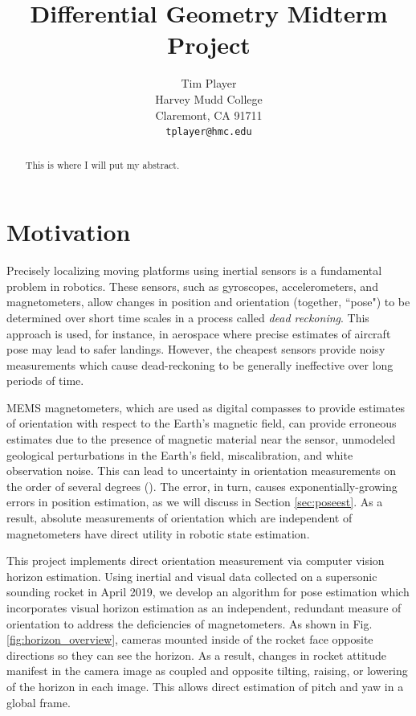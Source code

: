 \documentclass{article}
\title{Differential Geometry Midterm Project}
\author{%
 Tim Player \\
  Harvey Mudd College\\
  Claremont, CA 91711 \\
  \texttt{tplayer@hmc.edu} \\
}
\begin{document}
\maketitle

\begin{abstract}
    This is where I will put my abstract.
\end{abstract}

\section{Motivation}
Precisely localizing moving platforms using inertial sensors is a fundamental problem in robotics. These sensors, such as gyroscopes, accelerometers, and magnetometers, allow changes in position and orientation (together, ``pose") to be determined over short time scales in a process called \textit{dead reckoning}. This approach is used, for instance, in aerospace where precise estimates of aircraft pose may lead to safer landings. However, the cheapest sensors provide noisy measurements which cause dead-reckoning to be generally ineffective over long periods of time. 

MEMS magnetometers, which are used as digital compasses to provide estimates of orientation with respect to the Earth's magnetic field, can provide erroneous estimates due to the presence of magnetic material near the sensor, unmodeled geological perturbations in the Earth's field, miscalibration, and white observation noise. This can lead to uncertainty in orientation measurements on the order of several degrees (\cite{introtoor}). The error, in turn, causes exponentially-growing errors in position estimation, as we will discuss in Section \ref{sec:poseest}. As a result, absolute measurements of orientation which are independent of magnetometers have direct utility in robotic state estimation.

This project implements direct orientation measurement via computer vision horizon estimation. Using inertial and visual data collected on a supersonic sounding rocket in April 2019, we develop an algorithm for pose estimation which incorporates visual horizon estimation as an independent, redundant measure of orientation to address the deficiencies of magnetometers. As shown in Fig. \ref{fig:horizon_overview}, cameras mounted inside of the rocket face opposite directions so they can see the horizon. As a result, changes in rocket attitude manifest in the camera image as coupled and opposite tilting, raising, or lowering of the horizon in each image. This allows direct estimation of pitch and yaw in a global frame.
\end{document}
